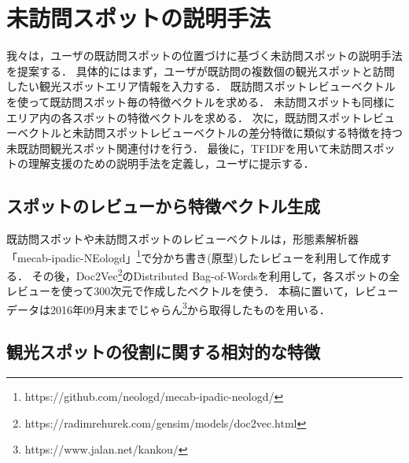 \documentclass{deimj}
\begin{document}
\section{未訪問スポットの説明手法}
\label{sec:An Explaination Method of Unfamiliar Tourist Spots}
我々は，ユーザの既訪問スポットの位置づけに基づく未訪問スポットの説明手法を提案する．
具体的にはまず，ユーザが既訪問の複数個の観光スポットと訪問したい観光スポットエリア情報を入力する．
既訪問スポットレビューベクトルを使って既訪問スポット毎の特徴ベクトルを求める．
未訪問スポットも同様にエリア内の各スポットの特徴ベクトルを求める．
次に，既訪問スポットレビューベクトルと未訪問スポットレビューベクトルの差分特徴に類似する特徴を持つ未既訪問観光スポット関連付けを行う．
最後に，TFIDFを用いて未訪問スポットの理解支援のための説明手法を定義し，ユーザに提示する．

\subsection{スポットのレビューから特徴ベクトル生成}
\label{subsec:Generating feature vector from reviews of spot}
既訪問スポットや未訪問スポットのレビューベクトルは，形態素解析器「mecab-ipadic-NEologd」\footnote{https://github.com/neologd/mecab-ipadic-neologd/}で分かち書き(原型)したレビューを利用して作成する．
その後，Doc2Vec\footnote{https://radimrehurek.com/gensim/models/doc2vec.html}のDistributed Bag-of-Wordsを利用して，各スポットの全レビューを使って300次元で作成したベクトルを使う．
本稿に置いて，レビューデータは2016年09月末までじゃらん\footnote{https://www.jalan.net/kankou/}から取得したものを用いる．

\subsection{観光スポットの役割に関する相対的な特徴}
\label{subsec:Relative features for role of tourist spots}
\end{document}
